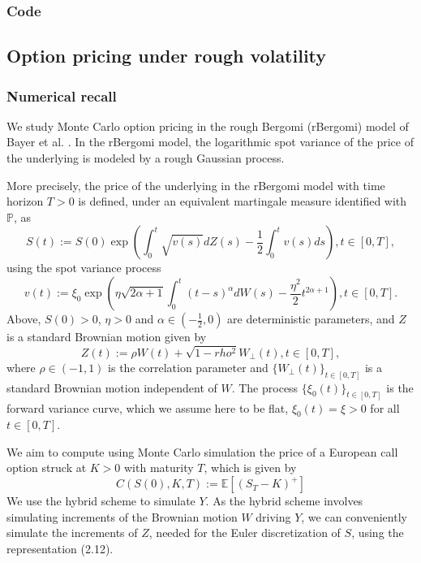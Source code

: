 \documentclass[12pt]{article}
\numberwithin{equation}{section}
\begin{document}
      \subsubsection{Code}
        
    \subsection{Option pricing under rough volatility}
        
      \subsubsection{Numerical recall}
        
      We study Monte Carlo option pricing in the rough Bergomi (rBergomi) model of Bayer et al. \cite{bayer2015pricing}. In the rBergomi model, the logarithmic spot variance of the price of the underlying is modeled by a rough Gaussian process.

      More precisely, the price of the underlying in the rBergomi model with time horizon $T > 0$ is defined, under an equivalent martingale measure identified with $\mathbb{P}$, as
      \begin{equation}
        S(t) := S(0) \exp\left(\int_0^t\sqrt{v(s)}dZ(s)-\frac{1}{2}\int_0^tv(s)ds\right), t\in[0,T],
      \end{equation}
      using the spot variance process
      \begin{equation}
        v(t) := \xi_0\exp\left(\eta\sqrt{2\alpha+1}\int_0^t(t-s)^\alpha dW(s) - \frac{\eta^2}{2}t^{2\alpha+1}\right), t\in[0,T].
      \end{equation}
      Above, $S(0) > 0$, $\eta > 0$ and $\alpha\in(-\frac{1}{2},0)$ are deterministic parameters, and $Z$ is a standard Brownian motion given by
      \begin{equation}
        Z(t):=\rho W(t)+ \sqrt{1-rho^2} W_\bot(t), t\in[0,T],
      \end{equation}
      where $\rho \in (-1,1)$ is the correlation parameter and $\{W_\bot(t)\}_{t\in[0,T]}$ is a standard Brownian motion independent of $W$. The process $\{\xi_0(t)\}_{t\in[0,T]}$ is the forward variance curve, which we assume here to be flat, $\xi_0(t) = \xi > 0$ for all $t \in [0,T]$.
      
      We aim to compute using Monte Carlo simulation the price of a European call option struck at $K > 0$ with maturity $T$, which is given by
      \begin{equation}
        C(S(0), K, T) := \mathbb{E} [(S_T - K)^+]
      \end{equation}
      We use the hybrid scheme to simulate $Y$. As the hybrid scheme involves simulating increments of the Brownian motion $W$ driving $Y$, we can conveniently simulate the increments of $Z$, needed for the Euler discretization of $S$, using the representation (2.12).
      
\end{document}
